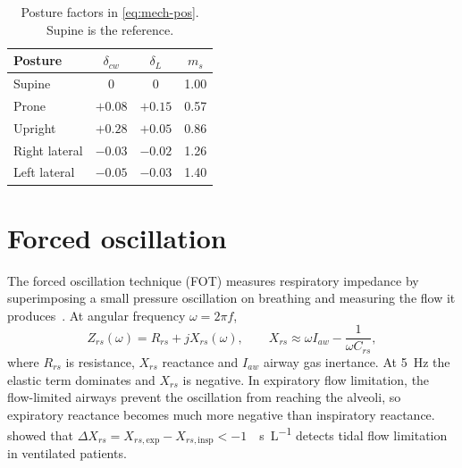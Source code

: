 \begin{table}[ht]
\centering
\caption{Posture factors in \cref{eq:mech-pos}. Supine is the reference.}
\label{tab:mech-pos}
\begin{tabular}{lccc}
\toprule
Posture & $\delta_{cw}$ & $\delta_L$ & $m_s$\\
\midrule
Supine & 0 & 0 & 1.00\\
Prone & $+0.08$ & $+0.15$ & 0.57\\
Upright & $+0.28$ & $+0.05$ & 0.86\\
Right lateral & $-0.03$ & $-0.02$ & 1.26\\
Left lateral & $-0.05$ & $-0.03$ & 1.40\\
\bottomrule
\end{tabular}
\end{table}

\section{Forced oscillation}
\label{sec:mech-fot}
The forced oscillation technique (FOT) measures respiratory impedance by superimposing a small pressure oscillation on breathing and measuring the flow it produces~\citep{dubois1956,dellaca2004}. At angular frequency $\omega=2\pi f$,
\begin{equation}
Z_{rs}(\omega)=R_{rs}+jX_{rs}(\omega),\qquad X_{rs}\approx\omega I_{aw}-\frac{1}{\omega C_{rs}},
\label{eq:mech-zrs}
\end{equation}
where $R_{rs}$ is resistance, $X_{rs}$ reactance and $I_{aw}$ airway gas inertance. At \SI{5}{\hertz} the elastic term dominates and $X_{rs}$ is negative. In expiratory flow limitation, the flow-limited airways prevent the oscillation from reaching the alveoli, so expiratory reactance becomes much more negative than inspiratory reactance. \citet{dellaca2004} showed that $\Delta X_{rs}=X_{rs,\mathrm{exp}}-X_{rs,\mathrm{insp}}<-1$~\si{\cmH\second\per\liter} detects tidal flow limitation in ventilated patients.

